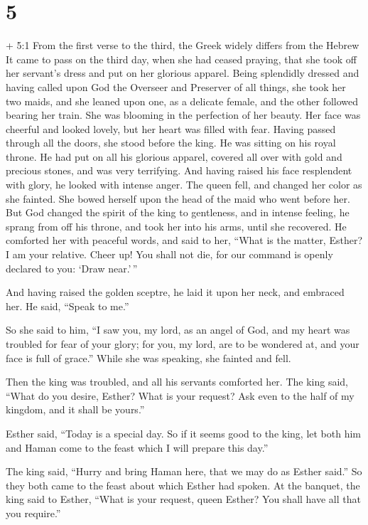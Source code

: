 \hypertarget{section-4}{%
\section{5}\label{section-4}}

 + 5:1 From the first verse to the third, the Greek widely
differs from the Hebrew It came to pass on the third day, when she had
ceased praying, that she took off her servant's dress and put on her
glorious apparel. Being splendidly dressed and having called upon God
the Overseer and Preserver of all things, she took her two maids, and
she leaned upon one, as a delicate female, and the other followed
bearing her train. She was blooming in the perfection of her beauty. Her
face was cheerful and looked lovely, but her heart was filled with fear.
Having passed through all the doors, she stood before the king. He was
sitting on his royal throne. He had put on all his glorious apparel,
covered all over with gold and precious stones, and was very terrifying.
And having raised his face resplendent with glory, he looked with
intense anger. The queen fell, and changed her color as she fainted. She
bowed herself upon the head of the maid who went before her. But God
changed the spirit of the king to gentleness, and in intense feeling, he
sprang from off his throne, and took her into his arms, until she
recovered. He comforted her with peaceful words, and said to her, ``What
is the matter, Esther? I am your relative. Cheer up! You shall not die,
for our command is openly declared to you: `Draw near.'\,''

 And having raised the golden sceptre, he laid it upon her
neck, and embraced her. He said, ``Speak to me.''

So she said to him, ``I saw you, my lord, as an angel of God, and my
heart was troubled for fear of your glory; for you, my lord, are to be
wondered at, and your face is full of grace.'' While she was speaking,
she fainted and fell.

Then the king was troubled, and all his servants comforted her.
 The king said, ``What do you desire, Esther? What is your
request? Ask even to the half of my kingdom, and it shall be yours.''

 Esther said, ``Today is a special day. So if it seems good
to the king, let both him and Haman come to the feast which I will
prepare this day.''

 The king said, ``Hurry and bring Haman here, that we may do
as Esther said.'' So they both came to the feast about which Esther had
spoken.  At the banquet, the king said to Esther, ``What is
your request, queen Esther? You shall have all that you require.''

